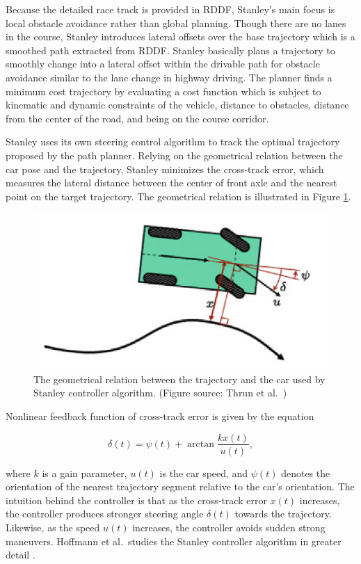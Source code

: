 Because the detailed race track is provided in RDDF, Stanley's main focus is
local obstacle avoidance rather than global planning. Though there are no lanes
in the course, Stanley introduces lateral offsets over the base trajectory
which is a smoothed path extracted from RDDF. Stanley basically plans a
trajectory to smoothly change into a lateral offset within the drivable path
for obstacle avoidance similar to the lane change in highway driving. The
planner finds a minimum cost trajectory by evaluating a cost function which is
subject to kinematic and dynamic constraints of the vehicle, distance to
obstacles, distance from the center of the road, and being on the course
corridor.

Stanley uses its own steering control algorithm to track the optimal trajectory
proposed by the path planner. Relying on the geometrical relation between the
car pose and the trajectory, Stanley minimizes the cross-track error, which
measures the lateral distance between the center of front axle and the nearest
point on the target trajectory. The geometrical relation is illustrated in
Figure \ref{figure:stanley-control}.

\begin{figure}[h]
  \centering
  \includegraphics[width=.8\textwidth]{figures/stanley-control.png}
  \caption[Stanley controller algorithm]{The geometrical relation between the
    trajectory and the car used by Stanley controller algorithm. (Figure
    source: Thrun et al.\ \cite{Thrun2006StanleyTR})}
  \label{figure:stanley-control}
\end{figure}

Nonlinear feedback function of cross-track error is given by the equation

\begin{equation}
  \delta(t) = \psi(t) + \arctan\frac{kx(t)}{u(t)},
  \label{eq:stanley-control}
\end{equation}

where $k$ is a gain parameter, $u(t)$ is the car speed, and $\psi(t)$ denotes
the orientation of the nearest trajectory segment relative to the car's
orientation. The intuition behind the controller is that as the cross-track
error $x(t)$ increases, the controller produces stronger steering angle
$\delta(t)$ towards the trajectory. Likewise, as the speed $u(t)$ increases,
the controller avoids sudden strong maneuvers. Hoffmann et al.\ studies the
Stanley controller algorithm in greater detail \cite{Hoffmann2007AutonomousAT}.

